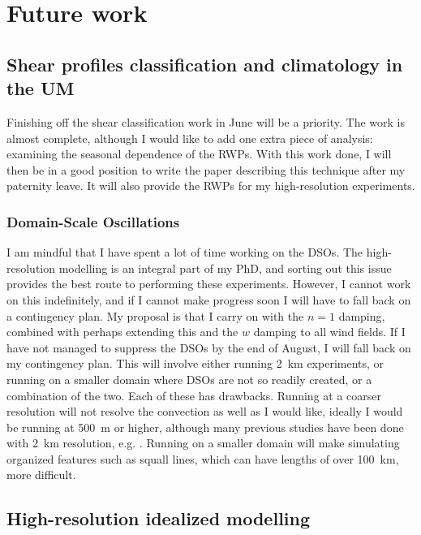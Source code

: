 \documentclass[11pt,a4paper]{article}
\begin{document}
\section{Future work}
\label{sec:Future work}

\subsection{Shear profiles classification and climatology in the UM}
\label{sec:Shear climatology in the UM}

Finishing off the shear classification work in June will be a priority. The work is almost complete, although I would like to add one extra piece of analysis: examining the seasonal dependence of the RWPs. With this work done, I will then be in a good position to write the paper describing this technique after my paternity leave. It will also provide the RWPs for my high-resolution experiments.

\subsubsection{Domain-Scale Oscillations}
\label{sec:dso_future}
I am mindful that I have spent a lot of time working on the DSOs. The high-resolution modelling is an integral part of my PhD, and sorting out this issue provides the best route to performing these experiments. However, I cannot work on this indefinitely, and if I cannot make progress soon I will have to fall back on a contingency plan. My proposal is that I carry on with the $n = 1$ damping, combined with perhaps extending this and the $w$ damping to all wind fields. If I have not managed to suppress the DSOs by the end of August, I will fall back on my contingency plan. This will involve either running \SI{2}{km} experiments, or running on a smaller domain where DSOs are not so readily created, or a combination of the two. Each of these has drawbacks. Running at a coarser resolution will not resolve the convection as well as I would like, ideally I would be running at \SI{500}{m} or higher, although many previous studies have been done with \SI{2}{km} resolution, e.g. \cite{tompkins2017organization}. Running on a smaller domain will make simulating organized features such as squall lines, which can have lengths of over \SI{100}{km}, more difficult.

\subsection{High-resolution idealized modelling}
\label{sec:High-resolution idealized modelling}
\end{document}
